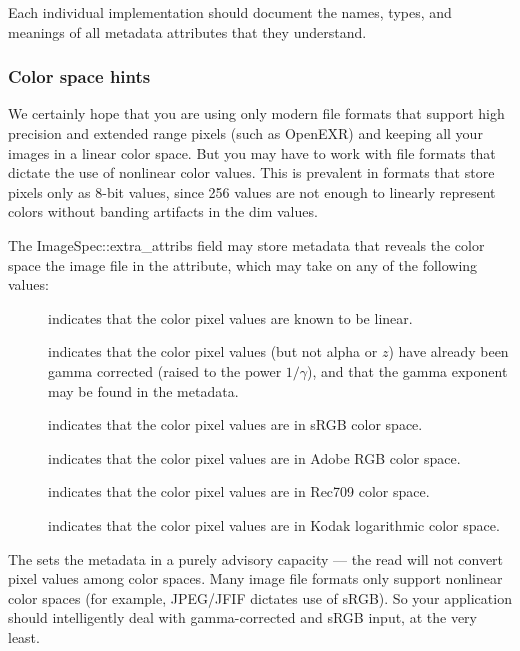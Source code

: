 Each individual \ImageInput implementation should document the names,
types, and meanings of all metadata attributes that they understand.

\subsubsection{Color space hints}

We certainly hope that you are using only modern file formats that
support high precision and extended range pixels (such as OpenEXR) and
keeping all your images in a linear color space.  But you may have to
work with file formats that dictate the use of nonlinear color values.
This is prevalent in formats that store pixels only as 8-bit values,
since 256 values are not enough to linearly represent colors without
banding artifacts in the dim values.

The {\cf ImageSpec::extra_attribs} field may store metadata that reveals
the color space the image file in the 
attribute, which may take on any of the following values:

\begin{description}
\item[\halfspc \rm {}] indicates that the
  color pixel values are known to be linear.
\item[\halfspc \rm {}] indicates
  that the color pixel values (but not alpha or $z$) have
  already been gamma corrected (raised to the power $1/\gamma$), and
  that the gamma exponent may be found in the  metadata.
\item[\halfspc \rm {}] indicates that the
  color pixel values are in sRGB color space.
\item[\halfspc \rm {}] indicates that the
  color pixel values are in Adobe RGB color space.
\item[\halfspc \rm {}] indicates that the
  color pixel values are in Rec709 color space.
\item[\halfspc \rm {}] indicates that the
  color pixel values are in Kodak logarithmic color space.
\end{description}

The \ImageInput sets the  metadata in a
purely advisory capacity --- the {\cf read} will not convert pixel
values among color spaces.  Many image file formats only support
nonlinear color spaces (for example, JPEG/JFIF dictates use of sRGB).
So your application should intelligently deal with gamma-corrected and
sRGB input, at the very least.

